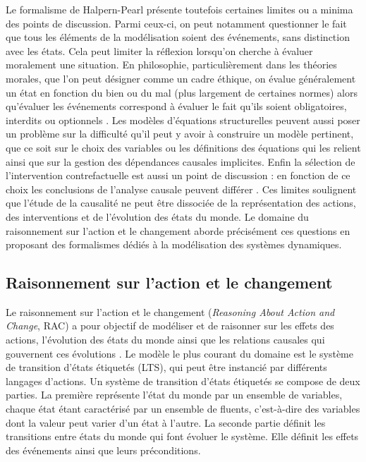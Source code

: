 Le formalisme de Halpern-Pearl présente toutefois certaines limites ou a minima des points de discussion. Parmi ceux-ci, on peut notamment questionner le fait que tous les éléments de la modélisation soient des événements, sans distinction avec les états. Cela peut limiter la réflexion lorsqu'on cherche à évaluer moralement une situation. En philosophie, particulièrement dans les théories morales, que l'on peut désigner comme un cadre éthique, on évalue généralement un état en fonction du bien ou du mal (plus largement de certaines normes) alors qu'évaluer les événements correspond à évaluer le fait qu'ils soient obligatoires, interdits ou optionnels \parencite{sarmiento2023actionlanguagesbasedactual}. Les modèles d'équations structurelles peuvent aussi poser un problème sur la difficulté qu'il peut y avoir à construire un modèle pertinent, que ce soit sur le choix des variables ou les définitions des équations qui les relient ainsi que sur la gestion des dépendances causales implicites. Enfin la sélection de l'intervention contrefactuelle est aussi un point de discussion : en fonction de ce choix les conclusions de l'analyse causale peuvent différer \parencite{damico_interventionist_nodate}. Ces limites soulignent que l'étude de la causalité ne peut être dissociée de la représentation des actions, des interventions et de l'évolution des états du monde. Le domaine du raisonnement sur l'action et le changement aborde précisément ces questions en proposant des formalismes dédiés à la modélisation des systèmes dynamiques.


\subsection{Raisonnement sur l'action et le changement}

Le raisonnement sur l'action et le changement (\textit{Reasoning About Action and Change}, RAC) a pour objectif de modéliser et de raisonner sur les effets des actions, l'évolution des états du monde ainsi que les relations causales qui gouvernent ces évolutions \parencite{rac}. Le modèle le plus courant du domaine est le système de transition d'états étiquetés (LTS), qui peut être instancié par différents langages d'actions. Un système de transition d'états étiquetés se compose de deux parties. La première représente l'état du monde par un ensemble de variables, chaque état étant caractérisé par un ensemble de fluents, c'est-à-dire des variables dont la valeur peut varier d'un état à l'autre. La seconde partie définit les transitions entre états du monde qui font évoluer le système. Elle définit les effets des événements ainsi que leurs préconditions. 

